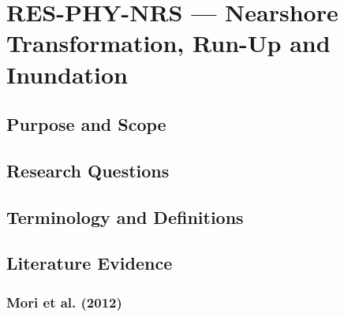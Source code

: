 
\section{RES-PHY-NRS --- Nearshore Transformation, Run-Up and Inundation}
\label{sec:res-phy-nrs}

\subsection{Purpose and Scope}
\label{sec:res-phy-nrs-purpose}


\subsection{Research Questions}
\label{sec:res-phy-nrs-research-questions}


\subsection{Terminology and Definitions}
\label{sec:res-phy-nrs-definitions}


\subsection{Literature Evidence}
\label{sec:res-phy-nrs-literature-evidence}

%

\subsubsection{Mori et al. (2012)} 
\label{sec:res-phy-nrs-evidence-mori-2012} 


